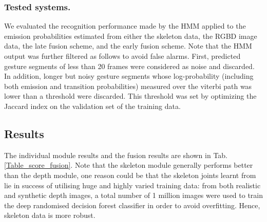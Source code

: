 \subsubsection{Tested systems.}

We evaluated the recognition performance made by the HMM applied to the emission probabilities estimated from either  
the skeleton data, the RGBD image data, the late fusion scheme, and the early fusion scheme.
%
Note that the HMM output was further filtered as follows to avoid false alarms. 
First, predicted gesture segments of less than 20 frames were considered as noise and discarded. 
%
In addition, longer but noisy gesture segments whose log-probability (including both emission and transition probabilities)  measured over the viterbi path 
was lower than a threshold were discarded.
%
This threshold was set by optimizing the Jaccard index on the validation set  of the training data.


\subsection{Results}

The individual module results and the fusion results are shown in Tab. \ref{Table_score_fusion}. Note that the skeleton module generally performs better than the depth module, one reason could be that the skeleton joints learnt from~\cite{shotton2011real} lie in success of utilising huge and highly varied training data: from both realistic and synthetic depth images, a total number of 1 million images were used to train the deep randomised decision forest classifier in order to avoid overfitting. Hence, skeleton data is more robust.

